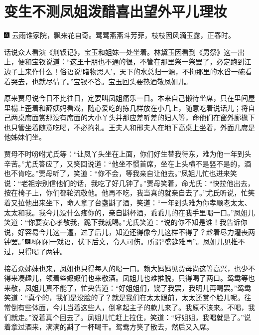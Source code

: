 

\chapter{变生不测凤姐泼醋\hspace{.5em}喜出望外平儿理妆}

{\includegraphics[width=3mm]{../Images/00005}  \kaishu 云雨谁家院，飘来花自奇。莺莺燕燕斗芳菲，枝枝因风滴玉露，正春时。}

话说众人看演《荆钗记》，宝玉和姐妹一处坐着。林黛玉因看到《男祭》这一出上，便和宝钗说道：``这王十朋也不通的很，不管在那里祭一祭罢了，必定跑到江边子上来作什么！俗语说`睹物思人'，天下的水总归一源，不拘那里的水舀一碗看着哭去，也就尽情了。''宝钗不答。宝玉回头要热酒敬凤姐儿。

原来贾母说今日不比往日，定要叫凤姐痛乐一日。本来自己懒待坐席，只在里间屋里榻上歪着和薛姨妈看戏，随心爱吃的拣几样放在小几上，随意吃着说话儿；将自己两桌席面赏那没有席面的大小丫头并那应差听差的妇人等，命他们在窗外廊檐下也只管坐着随意吃喝，不必拘礼。王夫人和邢夫人在地下高桌上坐着，外面几席是他姊妹们坐。

贾母不时吩咐尤氏等：``让凤丫头坐在上面，你们好生替我待东，难为他一年到头辛苦。''尤氏答应了，又笑回说道：``他坐不惯首席，坐在上头横不是竖不是的，酒也不肯吃。''贾母听了，笑道：``你不会，等我亲自让他去。''凤姐儿忙也进来笑说：``老祖宗别信他们的话，我吃了好几钟了。''贾母笑着，命尤氏：``快拉他出去，按在椅子上，你们都轮流敬他。他再不吃，我当真的就亲自去了。''尤氏听说，忙笑着又拉他出来坐下，命人拿了台盏斟了酒，笑道：``一年到头难为你孝顺老太太、太太和我。我今儿没什么疼你的，亲自斟杯酒，乖乖儿的在我手里喝一口。''凤姐儿笑道：``你要安心孝敬我，跪下我就喝。''尤氏笑道：``说的你不知是谁！我告诉你说，好容易今儿这一遭，过了后儿，知道还得像今儿这样不得了？趁着尽力灌丧两钟罢。''{\includegraphics[width=3mm]{../Images/00004}\includegraphics[width=3mm]{../Images/00012}\footnotesize \kaishu 闲闲一戏语，伏下后文，令人可伤。所谓``盛筵难再''。}凤姐儿见推不过，只得喝了两钟。

接着众姊妹也来，凤姐也只得每人的喝一口。赖大妈妈见贾母尚这等高兴，也少不得来凑趣儿，领着些嬷嬷们也来敬酒。凤姐儿也难推脱，只得喝了两口。鸳鸯等也来敬，凤姐儿真不能了，忙央告道：``好姐姐们，饶了我罢，我明儿再喝罢。''鸳鸯笑道：``真个的，我们是没脸的了？就是我们在太太跟前，太太还赏个脸儿呢。往常倒有些体面，今儿当着这些人，倒拿起主子的款儿来了。我原不该来。不喝，我们就走。''说着真个回去了。凤姐儿忙赶上拉住，笑道：``好姐姐，我喝就是了。''说着拿过酒来，满满的斟了一杯喝干。鸳鸯方笑了散去，然后又入席。

